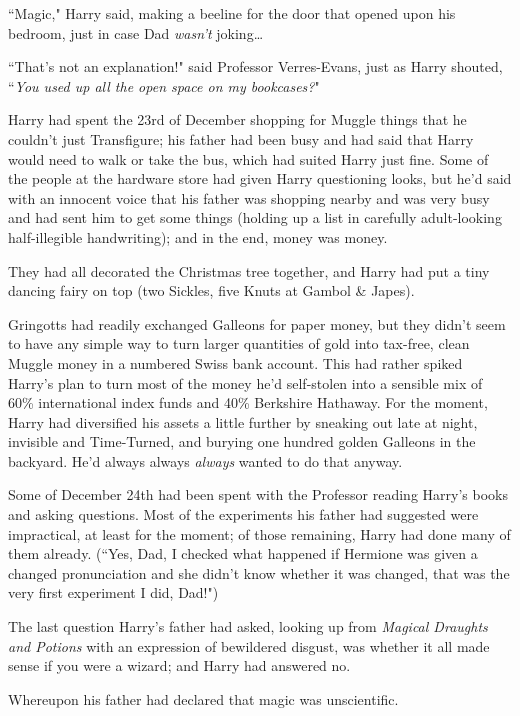 ``Magic," Harry said, making a beeline for the door that opened upon his bedroom, just in case Dad \emph{wasn't} joking…

``That's not an explanation!" said Professor Verres-Evans, just as Harry shouted, ``\emph{You used up all the open space on my bookcases?}"

\later

Harry had spent the 23rd of December shopping for Muggle things that he couldn't just Transfigure; his father had been busy and had said that Harry would need to walk or take the bus, which had suited Harry just fine. Some of the people at the hardware store had given Harry questioning looks, but he'd said with an innocent voice that his father was shopping nearby and was very busy and had sent him to get some things (holding up a list in carefully adult-looking half-illegible handwriting); and in the end, money was money.

They had all decorated the Christmas tree together, and Harry had put a tiny dancing fairy on top (two Sickles, five Knuts at Gambol \& Japes).

Gringotts had readily exchanged Galleons for paper money, but they didn't seem to have any simple way to turn larger quantities of gold into tax-free, clean Muggle money in a numbered Swiss bank account. This had rather spiked Harry's plan to turn most of the money he'd self-stolen into a sensible mix of 60\% international index funds and 40\% Berkshire Hathaway. For the moment, Harry had diversified his assets a little further by sneaking out late at night, invisible and Time-Turned, and burying one hundred golden Galleons in the backyard. He'd always always \emph{always} wanted to do that anyway.

Some of December 24th had been spent with the Professor reading Harry's books and asking questions. Most of the experiments his father had suggested were impractical, at least for the moment; of those remaining, Harry had done many of them already. (``Yes, Dad, I checked what happened if Hermione was given a changed pronunciation and she didn't know whether it was changed, that was the very first experiment I did, Dad!")

The last question Harry's father had asked, looking up from \emph{Magical Draughts and Potions} with an expression of bewildered disgust, was whether it all made sense if you were a wizard; and Harry had answered no.

Whereupon his father had declared that magic was unscientific.

